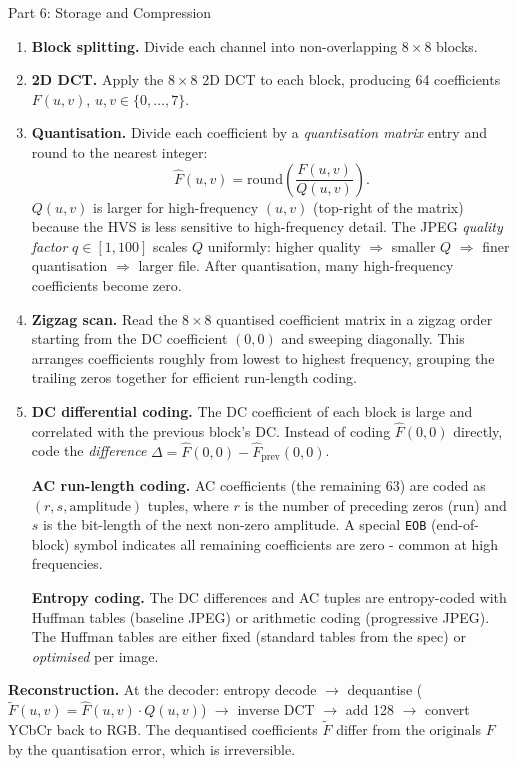 \documentclass[letterpaper]{article}
\begin{document}
\begin{notes}{Part 6: Storage and Compression}
\begin{enumerate}
    \item \textbf{Block splitting.} Divide each channel into non-overlapping $8\times8$ blocks.
    
    \item \textbf{2D DCT.} Apply the $8\times8$ 2D DCT to each block, producing 64 coefficients $F(u,v)$, $u,v \in \{0,\dots,7\}$.
    
    \item \textbf{Quantisation.} Divide each coefficient by a \emph{quantisation matrix} entry and round to the nearest integer:
    $$\hat{F}(u,v) = \mathrm{round}\!\left(\frac{F(u,v)}{Q(u,v)}\right).$$
    $Q(u,v)$ is larger for high-frequency $(u,v)$ (top-right of the matrix) because the HVS is less sensitive to high-frequency detail. The JPEG \emph{quality factor} $q\in[1,100]$ scales $Q$ uniformly: higher quality $\Rightarrow$ smaller $Q$ $\Rightarrow$ finer quantisation $\Rightarrow$ larger file. After quantisation, many high-frequency coefficients become zero.
    
    \item \textbf{Zigzag scan.} Read the $8\times8$ quantised coefficient matrix in a zigzag order starting from the DC coefficient $(0,0)$ and sweeping diagonally. This arranges coefficients roughly from lowest to highest frequency, grouping the trailing zeros together for efficient run-length coding.
    
    \item \textbf{DC differential coding.} The DC coefficient of each block is large and correlated with the previous block's DC. Instead of coding $\hat{F}(0,0)$ directly, code the \emph{difference} $\Delta = \hat{F}(0,0) - \hat{F}_{\text{prev}}(0,0)$.
    
    \textbf{AC run-length coding.} AC coefficients (the remaining 63) are coded as $(r, s, \text{amplitude})$ tuples, where $r$ is the number of preceding zeros (run) and $s$ is the bit-length of the next non-zero amplitude. A special \texttt{EOB} (end-of-block) symbol indicates all remaining coefficients are zero - common at high frequencies.
    
    \textbf{Entropy coding.} The DC differences and AC tuples are entropy-coded with Huffman tables (baseline JPEG) or arithmetic coding (progressive JPEG). The Huffman tables are either fixed (standard tables from the spec) or \emph{optimised} per image.
\end{enumerate}



\textbf{Reconstruction.} At the decoder: entropy decode $\to$ dequantise ($\tilde{F}(u,v) = \hat{F}(u,v)\cdot Q(u,v)$) $\to$ inverse DCT $\to$ add 128 $\to$ convert YCbCr back to RGB. The dequantised coefficients $\tilde{F}$ differ from the originals $F$ by the quantisation error, which is irreversible.\\


\end{notes}
\end{document}
